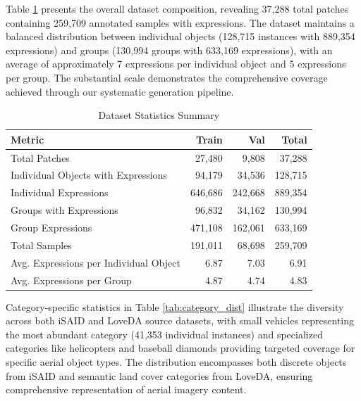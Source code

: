 Table \ref{tab:dataset_stats} presents the overall dataset composition, revealing 37,288 total patches containing 259,709 annotated samples with expressions. The dataset maintains a balanced distribution between individual objects (128,715 instances with 889,354 expressions) and groups (130,994 groups with 633,169 expressions), with an average of approximately 7 expressions per individual object and 5 expressions per group. The substantial scale demonstrates the comprehensive coverage achieved through our systematic generation pipeline.

\begin{table}[H]
\centering
\caption{Dataset Statistics Summary}
\label{tab:dataset_stats}
\begin{tabular}{@{}lrrr@{}}
\toprule
\textbf{Metric} & \textbf{Train} & \textbf{Val} & \textbf{Total} \\
\midrule
Total Patches & 27,480 & 9,808 & 37,288 \\
Individual Objects with Expressions & 94,179 & 34,536 & 128,715 \\
Individual Expressions & 646,686 & 242,668 & 889,354 \\
Groups with Expressions & 96,832 & 34,162 & 130,994 \\
Group Expressions & 471,108 & 162,061 & 633,169 \\
Total Samples & 191,011 & 68,698 & 259,709 \\
Avg. Expressions per Individual Object & 6.87 & 7.03 & 6.91 \\
Avg. Expressions per Group & 4.87 & 4.74 & 4.83 \\
\bottomrule
\end{tabular}
\end{table}

Category-specific statistics in Table \ref{tab:category_dist} illustrate the diversity across both iSAID and LoveDA source datasets, with small vehicles representing the most abundant category (41,353 individual instances) and specialized categories like helicopters and baseball diamonds providing targeted coverage for specific aerial object types. The distribution encompasses both discrete objects from iSAID and semantic land cover categories from LoveDA, ensuring comprehensive representation of aerial imagery content.

